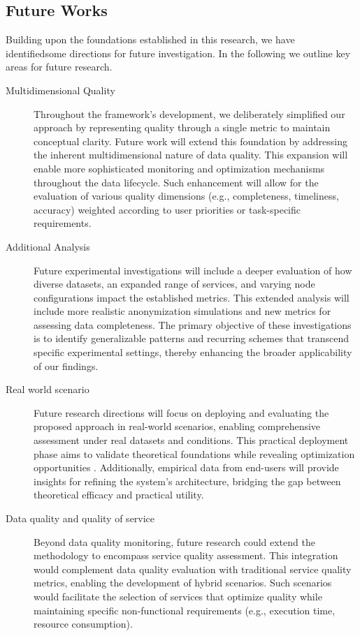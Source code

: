 \documentclass[sn-mathphys-num,referee]{sn-jnl}
\theoremstyle{definition}
\begin{document}
{\color{OurColor}
  \subsection{Future Works}
Building upon the foundations established in this research, we have identifiedsome directions for future investigation. In the following we outline key areas for future research.
\begin{description}
  \item[Multidimensional Quality] Throughout the framework's development, we deliberately simplified our approach by representing quality through a single metric to maintain conceptual clarity. Future work will extend this foundation by addressing the inherent multidimensional nature of data quality. This expansion will enable more sophisticated monitoring and optimization mechanisms throughout the data lifecycle. Such enhancement will allow for the evaluation of various quality dimensions (e.g., completeness, timeliness, accuracy) weighted according to user priorities or task-specific requirements.
  \item[Additional Analysis] Future experimental investigations will include a deeper evaluation of how diverse datasets, an expanded range of services, and varying node configurations impact the established metrics. This extended analysis will include more realistic anonymization simulations and new metrics for assessing data completeness. The primary objective of these investigations is to identify generalizable patterns and recurring schemes that transcend specific experimental settings, thereby enhancing the broader applicability of our findings.
  \item[Real world scenario] Future research directions will focus on deploying and evaluating the proposed approach in real-world scenarios, enabling comprehensive assessment under real datasets and conditions. This practical deployment phase aims to validate theoretical foundations while revealing optimization opportunities . Additionally, empirical data from end-users will provide insights for refining the system's architecture, bridging the gap between theoretical efficacy and practical utility.
  \item[Data quality and quality of service] Beyond data quality monitoring, future research could extend the methodology to encompass service quality assessment. This integration would complement data quality evaluation with traditional service quality metrics, enabling the development of hybrid scenarios. Such scenarios would facilitate the selection of services that optimize quality while maintaining specific non-functional requirements (e.g., execution time, resource consumption).
\end{description}
}


\clearpage
\end{document}
